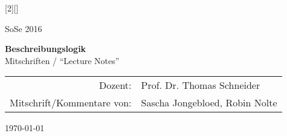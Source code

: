 [2][]{
    \thispagestyle{empty}

    \begin{minipage}[H]{\textwidth}
        \vspace{3.5cm}
        \begin{center}
                \Large SoSe 2016 

                \vspace{1cm}
                \LARGE \textbf{Beschreibungslogik} \\

                \vspace{3cm}
                \Large Mitschriften / \enquote{Lecture Notes}\\
        \end{center}
    \end{minipage}
    \vfill
    \vfill

    \begin{minipage}[H]{\textwidth}
        \begin{center}

                \begin{tabular}{ r l }
                  Dozent: & Prof. Dr. Thomas Schneider\\
                  Mitschrift/Kommentare von: & Sascha Jongebloed, Robin Nolte\\
                \end{tabular}
        \end{center}
    \end{minipage}
    \vspace{.5cm}

    \begin{center}
        \today
    \end{center}
    \newpage
}

\newcommand{\settableofcontents} {
    \setcounter{tocdepth}{4}
    \tableofcontents
    \newpage
}

\newcommand{\setbibliography} {
    \clearpage
    \phantomsection
    \label{ch:bib}%
    \addcontentsline{toc}{section}{Literatur}%
        \nocite{*}%
}
